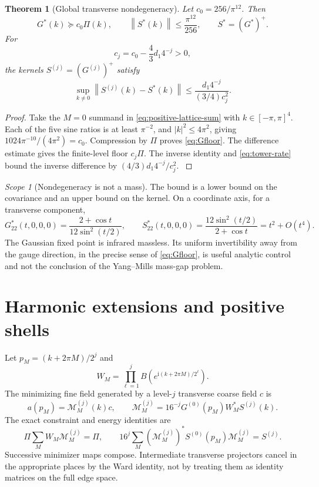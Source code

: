\documentclass[11pt,oneside,openany]{book}
\newtheorem{theorem}{Theorem}[chapter]
\theoremstyle{definition}
\theoremstyle{remark}
\newtheorem{scope}[scope]{Scope}
\newcommand{\ii}{\mathrm i}
\newcommand{\norm}[1]{\left\lVert#1\right\rVert}
\newcommand{\src}[2]{\cite[#2]{#1}}
\begin{document}
\begin{theorem}[Global transverse nondegeneracy]\label{thm:tower-floor}
Let $c_0=256/\pi^{12}$. Then
\begin{equation}\label{eq:Gfloor}
G^*(k)\succeq c_0\Pi(k),\qquad
\norm{S^*(k)}\le\frac{\pi^{12}}{256},\qquad S^*=(G^*)^+.
\end{equation}
For
\[
c_j=c_0-\frac43d_1 4^{-j}>0,
\]
the kernels $S^{(j)}=(G^{(j)})^+$ satisfy
\begin{equation}\label{eq:Srate}
\sup_{k\ne0}\norm{S^{(j)}(k)-S^*(k)}
\le\frac{d_1 4^{-j}}{(3/4)c_j^2}.
\end{equation}
\end{theorem}
\begin{proof}
Take the $M=0$ summand in \cref{eq:positive-lattice-sum} with $k\in[-\pi,\pi]^4$. Each of the five sine ratios is at least $\pi^{-2}$, and $|k|^2\le4\pi^2$, giving $1024\pi^{-10}/(4\pi^2)=c_0$. Compression by $\Pi$ proves \cref{eq:Gfloor}. The difference estimate gives the finite-level floor $c_j\Pi$. The inverse identity and \cref{eq:tower-rate} bound the inverse difference by $(4/3)d_1 4^{-j}/c_j^2$. \src{F11}{V37}
\end{proof}

\begin{scope}[Nondegeneracy is not a mass]
The bound is a lower bound on the covariance and an upper bound on the kernel. On a coordinate axis, for a transverse component,
\begin{equation}\label{eq:axis}
G^*_{22}(t,0,0,0)=\frac{2+\cos t}{12\sin^2(t/2)},
\qquad
S^*_{22}(t,0,0,0)=\frac{12\sin^2(t/2)}{2+\cos t}
=t^2+O(t^4).
\end{equation}
The Gaussian fixed point is infrared massless. Its uniform invertibility away from the gauge direction, in the precise sense of \cref{eq:Gfloor}, is useful analytic control and not the conclusion of the Yang--Mills mass-gap problem.
\end{scope}

\section{Harmonic extensions and positive shells}
Let $p_M=(k+2\pi M)/2^j$ and
\[
W_M=\prod_{\ell=1}^{j}B(e^{\ii(k+2\pi M)/2^\ell}).
\]
The minimizing fine field generated by a level-$j$ transverse coarse field $c$ is
\begin{equation}\label{eq:tower-minimizer}
a(p_M)=\mathcal M_M^{(j)}(k)c,
\qquad
\mathcal M_M^{(j)}=16^{-j}G^{(0)}(p_M)W_M^*S^{(j)}(k).
\end{equation}
The exact constraint and energy identities are
\begin{equation}\label{eq:tower-min-identities}
\Pi\sum_MW_M\mathcal M_M^{(j)}=\Pi,
\qquad
16^j\sum_M(\mathcal M_M^{(j)})^*S^{(0)}(p_M)\mathcal M_M^{(j)}=S^{(j)}.
\end{equation}
Successive minimizer maps compose. Intermediate transverse projectors cancel in the appropriate places by the Ward identity, not by treating them as identity matrices on the full edge space.
\end{document}
